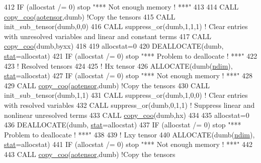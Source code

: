 \begin{DoxyCode}
412     \textcolor{keywordflow}{IF} (allocstat /= 0) stop \textcolor{stringliteral}{"*** Not enough memory ! ***"}
413 
414     \textcolor{keyword}{CALL }\hyperlink{namespacetensor_a14f95c256cdf137ca0767ddb3c87deea}{copy\_coo}(\hyperlink{namespaceaotensor__def_a0dc43bc9294a18f2fe57b67489f1702f}{aotensor},dumb) \textcolor{comment}{!Copy the tensors}
415     \textcolor{keyword}{CALL }init\_sub\_tensor(dumb,0,0)
416     \textcolor{keyword}{CALL }suppress\_or(dumb,1,1,1) \textcolor{comment}{! Clear entries with unresolved variables and linear and constant terms}
417     \textcolor{keyword}{CALL }\hyperlink{namespacetensor_a14f95c256cdf137ca0767ddb3c87deea}{copy\_coo}(dumb,byxx)
418 
419     allocstat=0
420     \textcolor{keyword}{DEALLOCATE}(dumb, \hyperlink{namespacestat}{stat}=allocstat)
421     \textcolor{keywordflow}{IF} (allocstat /= 0)  stop \textcolor{stringliteral}{"*** Problem to deallocate ! ***"}
422 
423     \textcolor{comment}{! Resolved tensors}
424 
425     \textcolor{comment}{! Hx tensor}
426     \textcolor{keyword}{ALLOCATE}(dumb(\hyperlink{namespaceparams_a2323fe1773f086e20c14f266351c482b}{ndim}), \hyperlink{namespacestat}{stat}=allocstat)
427     \textcolor{keywordflow}{IF} (allocstat /= 0) stop \textcolor{stringliteral}{"*** Not enough memory ! ***"}
428 
429     \textcolor{keyword}{CALL }\hyperlink{namespacetensor_a14f95c256cdf137ca0767ddb3c87deea}{copy\_coo}(\hyperlink{namespaceaotensor__def_a0dc43bc9294a18f2fe57b67489f1702f}{aotensor},dumb) \textcolor{comment}{!Copy the tensors}
430     \textcolor{keyword}{CALL }init\_sub\_tensor(dumb,1,1)
431     \textcolor{keyword}{CALL }suppress\_or(dumb,1,0,0) \textcolor{comment}{! Clear entries with resolved variables}
432     \textcolor{keyword}{CALL }suppress\_or(dumb,0,1,1) \textcolor{comment}{! Suppress linear and nonlinear unresolved terms}
433     \textcolor{keyword}{CALL }\hyperlink{namespacetensor_a14f95c256cdf137ca0767ddb3c87deea}{copy\_coo}(dumb,hx)
434 
435     allocstat=0
436     \textcolor{keyword}{DEALLOCATE}(dumb, \hyperlink{namespacestat}{stat}=allocstat)
437     \textcolor{keywordflow}{IF} (allocstat /= 0)  stop \textcolor{stringliteral}{"*** Problem to deallocate ! ***"}
438 
439     \textcolor{comment}{! Lxy tensor}
440     \textcolor{keyword}{ALLOCATE}(dumb(\hyperlink{namespaceparams_a2323fe1773f086e20c14f266351c482b}{ndim}), \hyperlink{namespacestat}{stat}=allocstat)
441     \textcolor{keywordflow}{IF} (allocstat /= 0) stop \textcolor{stringliteral}{"*** Not enough memory ! ***"}
442 
443     \textcolor{keyword}{CALL }\hyperlink{namespacetensor_a14f95c256cdf137ca0767ddb3c87deea}{copy\_coo}(\hyperlink{namespaceaotensor__def_a0dc43bc9294a18f2fe57b67489f1702f}{aotensor},dumb) \textcolor{comment}{!Copy the tensors}

\end{DoxyCode}
